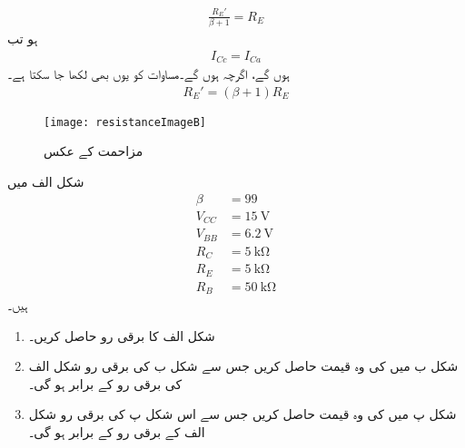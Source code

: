 \begin{align} \label{مساوات_ٹرانزسٹر_مخارج_کا_عکس_الف}
\frac{R_E'}{\beta+1}=R_E
\end{align}
ہو تب
\begin{align}
I_{Cc}=I_{Ca}
\end{align}
ہوں گے، اگرچہ   ہوں گے۔مساوات   کو یوں بھی لکھا جا سکتا ہے۔
\begin{align} \label{مساوات_ٹرانزسٹر_مخارج_کا_عکس}
R_E'=\left (\beta+1 \right )R_E
\end{align}
%
\begin{figure}
\centering
\texttt{[image: resistanceImageB]}
\caption{مزاحمت کے عکس}
\label{شکل_دیگر_مزاحمت_کے_عکس}
\end{figure}


شکل  الف میں
\begin{align*}
\beta&=99\\
V_{CC}&=\SI{15}{\volt}\\
V_{BB}&=\SI{6.2}{\volt}\\
R_C&=\SI{5}{\kilo \ohm}\\
R_E&=\SI{5}{\kilo \ohm}\\
R_B & = \SI{50}{\kilo \ohm}
\end{align*}
ہیں۔
\begin{enumerate}
\item
شکل   الف کا برقی رو حاصل کریں۔
\item
شکل  ب میں   کی وہ قیمت حاصل کریں جس سے شکل  ب کی برقی 	رو شکل  الف   کی برقی رو کے برابر ہو گی۔
\item
شکل  پ میں  کی وہ قیمت حاصل کریں جس سے اس شکل  پ کی برقی رو شکل  الف   کے برقی رو کے برابر ہو گی۔
\end{enumerate}	
	
